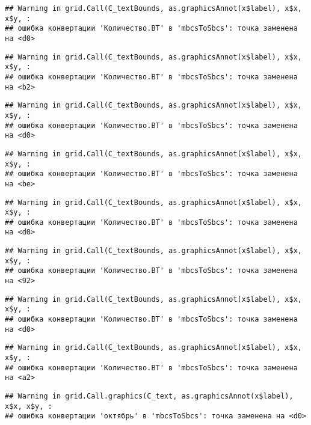 \documentclass[
]{article}
\begin{document}
\begin{verbatim}
## Warning in grid.Call(C_textBounds, as.graphicsAnnot(x$label), x$x, x$y, :
## ошибка конвертации 'Количество.ВТ' в 'mbcsToSbcs': точка заменена на <d0>
\end{verbatim}

\begin{verbatim}
## Warning in grid.Call(C_textBounds, as.graphicsAnnot(x$label), x$x, x$y, :
## ошибка конвертации 'Количество.ВТ' в 'mbcsToSbcs': точка заменена на <b2>
\end{verbatim}

\begin{verbatim}
## Warning in grid.Call(C_textBounds, as.graphicsAnnot(x$label), x$x, x$y, :
## ошибка конвертации 'Количество.ВТ' в 'mbcsToSbcs': точка заменена на <d0>
\end{verbatim}

\begin{verbatim}
## Warning in grid.Call(C_textBounds, as.graphicsAnnot(x$label), x$x, x$y, :
## ошибка конвертации 'Количество.ВТ' в 'mbcsToSbcs': точка заменена на <be>
\end{verbatim}

\begin{verbatim}
## Warning in grid.Call(C_textBounds, as.graphicsAnnot(x$label), x$x, x$y, :
## ошибка конвертации 'Количество.ВТ' в 'mbcsToSbcs': точка заменена на <d0>
\end{verbatim}

\begin{verbatim}
## Warning in grid.Call(C_textBounds, as.graphicsAnnot(x$label), x$x, x$y, :
## ошибка конвертации 'Количество.ВТ' в 'mbcsToSbcs': точка заменена на <92>
\end{verbatim}

\begin{verbatim}
## Warning in grid.Call(C_textBounds, as.graphicsAnnot(x$label), x$x, x$y, :
## ошибка конвертации 'Количество.ВТ' в 'mbcsToSbcs': точка заменена на <d0>
\end{verbatim}

\begin{verbatim}
## Warning in grid.Call(C_textBounds, as.graphicsAnnot(x$label), x$x, x$y, :
## ошибка конвертации 'Количество.ВТ' в 'mbcsToSbcs': точка заменена на <a2>
\end{verbatim}

\begin{verbatim}
## Warning in grid.Call.graphics(C_text, as.graphicsAnnot(x$label), x$x, x$y, :
## ошибка конвертации 'октябрь' в 'mbcsToSbcs': точка заменена на <d0>
\end{verbatim}
\end{document}
